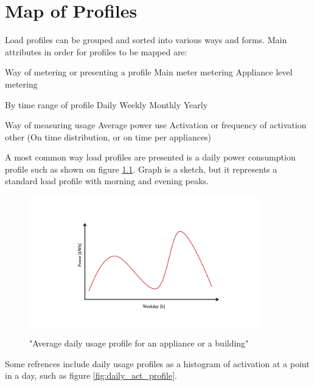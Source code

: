 
\chapter{Map of Profiles} %

\label{Chapter6} %

Load profiles can be grouped and sorted into various ways and forms.
Main attributes in order for profiles to be mapped are: 

\begin{outline}

\1 Way of metering or presenting a profile
\2 Main meter metering
\2 Appliance level metering

\1 By time range of profile 
\2 Daily
\2 Weekly
\2 Monthly
\2 Yearly

\1 Way of measuring usage
\2 Average power use 
\2 Activation or frequency of activation
\2 other (On time distribution, or on time per appliances)
\end{outline}

A most common way load profiles are presented is a daily power consumption profile such as shown on figure \ref{fig:daily_power_profile}. 
Graph is a sketch, but it represents a standard load profile with morning and evening peaks.

\begin{figure}[H]
	\centering
	\caption{"Average daily usage profile for an appliance or a building"}
	\includegraphics[width=0.9\textwidth]{Figures/profile_sketches/Slide1.png}
	\label{fig:daily_power_profile}
\end{figure}

Some refrences include daily usage profiles as a histogram of activation at a point in a day, such as figure \ref{fig:daily_act_profile}.

